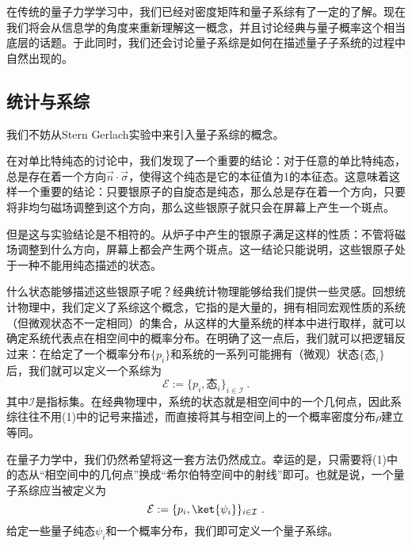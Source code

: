 


在传统的量子力学学习中，我们已经对密度矩阵和量子系综有了一定的了解。现在我们将会从信息学的角度来重新理解这一概念，并且讨论经典与量子概率这个相当底层的话题。于此同时，我们还会讨论量子系综是如何在描述量子子系统的过程中自然出现的。

\subsection{统计与系综}

我们不妨从Stern Gerlach实验中来引入量子系综的概念。

在对单比特纯态的讨论中，我们发现了一个重要的结论：对于任意的单比特纯态，总是存在着一个方向$\vec{n}\cdot\vec{\sigma}$，使得这个纯态是它的本征值为1的本征态。这意味着这样一个重要的结论：只要银原子的自旋态是纯态，那么总是存在着一个方向，只要将非均匀磁场调整到这个方向，那么这些银原子就只会在屏幕上产生一个斑点。

但是这与实验结论是不相符的。从炉子中产生的银原子满足这样的性质：不管将磁场调整到什么方向，屏幕上都会产生两个斑点。这一结论只能说明，这些银原子处于一种不能用纯态描述的状态。

什么状态能够描述这些银原子呢？经典统计物理能够给我们提供一些灵感。回想统计物理中，我们定义了系综这个概念，它指的是大量的，拥有相同宏观性质的系统（但微观状态不一定相同）的集合，从这样的大量系统的样本中进行取样，就可以确定系统代表点在相空间中的概率分布。在明确了这一点后，我们就可以把逻辑反过来：在给定了一个概率分布$\{p_i\}$和系统的一系列可能拥有（微观）状态$\{\text{态}_i\}$后，我们就可以定义一个系综为
\begin{equation}
\mathcal{E}:=\{p_i, \text{态}_i\}_{i\in\mathcal{I}}~.
\end{equation}
其中$\mathcal{I}$是指标集。在经典物理中，系统的状态就是相空间中的一个几何点，因此系综往往不用(1)中的记号来描述，而直接将其与相空间上的一个概率密度分布$\rho$建立等同。

在量子力学中，我们仍然希望将这一套方法仍然成立。幸运的是，只需要将(1)中的态从“相空间中的几何点”换成“希尔伯特空间中的射线”即可。也就是说，一个量子系综应当被定义为
\begin{equation}
\mathcal{E}:=\{p_i,\ket{\psi_i}\}_{i\in\mathcal{I}}~.
\end{equation}
给定一些量子纯态$\psi_i$和一个概率分布，我们即可定义一个量子系综。

